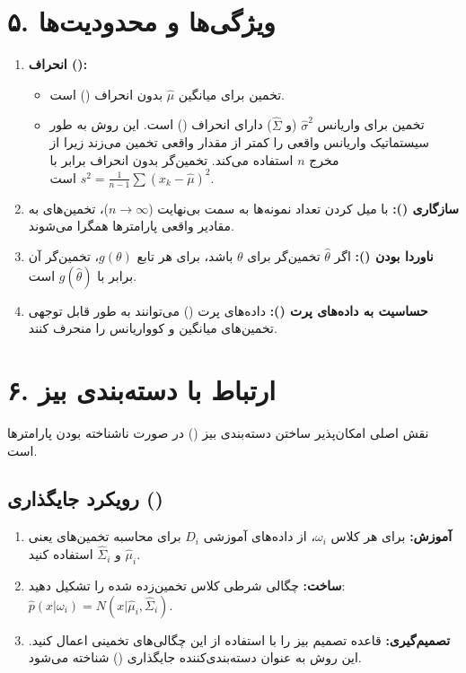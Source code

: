 \documentclass{article}
\begin{document}
\section*{۵. ویژگی‌ها و محدودیت‌ها}
\begin{enumerate}
    \item \textbf{انحراف ():}
    \begin{itemize}
        \item تخمین برای میانگین $\hat{\mu}$ بدون انحراف () است.
        \item تخمین برای واریانس $\hat{\sigma}^2$ (و $\hat{\Sigma}$) دارای انحراف () است. این روش به طور سیستماتیک واریانس واقعی را کمتر از مقدار واقعی تخمین می‌زند زیرا از مخرج $n$ استفاده می‌کند. تخمین‌گر بدون انحراف برابر با $s^2 = \frac{1}{n-1} \sum (x_k - \hat{\mu})^2$ است.
    \end{itemize}
    \item \textbf{سازگاری ():} با میل کردن تعداد نمونه‌ها به سمت بی‌نهایت ($n \to \infty$)، تخمین‌های  به مقادیر واقعی پارامترها همگرا می‌شوند.
    \item \textbf{ناوردا بودن ():} اگر $\hat{\theta}$ تخمین‌گر  برای $\theta$ باشد، برای هر تابع $g(\theta)$، تخمین‌گر  آن برابر با $g(\hat{\theta})$ است.
    \item \textbf{حساسیت به داده‌های پرت ():} داده‌های پرت () می‌توانند به طور قابل توجهی تخمین‌های میانگین و کوواریانس را منحرف کنند.
\end{enumerate}

\section*{۶. ارتباط با دسته‌بندی بیز}
نقش اصلی  امکان‌پذیر ساختن دسته‌بندی بیز () در صورت ناشناخته بودن پارامترها است.

\subsection*{رویکرد جایگذاری ()}
\begin{enumerate}
    \item \textbf{آموزش:} برای هر کلاس $\omega_i$، از داده‌های آموزشی $D_i$ برای محاسبه تخمین‌های  یعنی $\hat{\mu}_i$ و $\hat{\Sigma}_i$ استفاده کنید.
    \item \textbf{ساخت:} چگالی شرطی کلاس تخمین‌زده شده را تشکیل دهید: $\hat{p}(x|\omega_i) = N(x|\hat{\mu}_i, \hat{\Sigma}_i)$.
    \item \textbf{تصمیم‌گیری:} قاعده تصمیم بیز را با استفاده از این چگالی‌های تخمینی اعمال کنید. این روش به عنوان دسته‌بندی‌کننده جایگذاری () شناخته می‌شود.
\end{enumerate}
\end{document}
